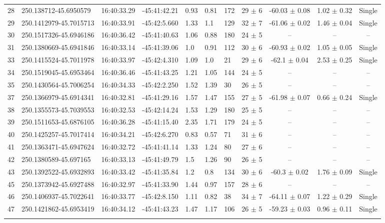 \begin{table}[htbp!]
\begin{tabular}{llllllllccc}
28  &  250.138712-45.6950579  &  16:40:33.29  &  -45:41:42.21  &  0.93  &  0.81  &  172  &  29 $\pm$ 6  &  -60.03 $\pm$ 0.08  &  1.02 $\pm$ 0.32  &  Single \\
29  &  250.1412979-45.7015713  &  16:40:33.91  &  -45:42:5.660  &  1.33  &  1.1  &  129  &  32 $\pm$ 7  &  -61.06 $\pm$ 0.02  &  1.46 $\pm$ 0.04  &  Single \\
30  &  250.1517326-45.6946186  &  16:40:36.42  &  -45:41:40.63  &  1.06  &  0.88  &  180  &  24 $\pm$ 5  &  --  &  --  &  -- \\
31  &  250.1380669-45.6941846  &  16:40:33.14  &  -45:41:39.06  &  1.0  &  0.91  &  112  &  30 $\pm$ 6  &  -60.93 $\pm$ 0.02  &  1.05 $\pm$ 0.05  &  Single \\
33  &  250.1415524-45.7011978  &  16:40:33.97  &  -45:42:4.310  &  1.09  &  1.0  &  21  &  29 $\pm$ 6  &  -62.1 $\pm$ 0.04  &  2.53 $\pm$ 0.25  &  Single \\
34  &  250.1519045-45.6953464  &  16:40:36.46  &  -45:41:43.25  &  1.21  &  1.05  &  144  &  24 $\pm$ 5  &  --  &  --  &  -- \\
35  &  250.1430564-45.7006254  &  16:40:34.33  &  -45:42:2.250  &  1.52  &  1.39  &  30  &  26 $\pm$ 5  &  --  &  --  &  -- \\
37  &  250.1366979-45.6914341  &  16:40:32.81  &  -45:41:29.16  &  1.57  &  1.47  &  155  &  27 $\pm$ 5  &  -61.98 $\pm$ 0.07  &  0.66 $\pm$ 0.24  &  Single \\
38  &  250.1355573-45.7039553  &  16:40:32.53  &  -45:42:14.24  &  1.53  &  1.29  &  180  &  25 $\pm$ 5  &  --  &  --  &  -- \\
39  &  250.1511653-45.6876105  &  16:40:36.28  &  -45:41:15.40  &  2.35  &  1.71  &  179  &  24 $\pm$ 5  &  --  &  --  &  -- \\
40  &  250.1425257-45.7017414  &  16:40:34.21  &  -45:42:6.270  &  0.83  &  0.57  &  71  &  31 $\pm$ 6  &  --  &  --  &  -- \\
41  &  250.1363471-45.6947624  &  16:40:32.72  &  -45:41:41.14  &  1.33  &  1.24  &  80  &  27 $\pm$ 6  &  --  &  --  &  -- \\
42  &  250.1380589-45.697165  &  16:40:33.13  &  -45:41:49.79  &  1.5  &  1.26  &  90  &  26 $\pm$ 5  &  --  &  --  &  -- \\
43  &  250.1392522-45.6932893  &  16:40:33.42  &  -45:41:35.84  &  1.2  &  0.8  &  134  &  30 $\pm$ 6  &  -60.3 $\pm$ 0.02  &  1.76 $\pm$ 0.09  &  Single \\
45  &  250.1373942-45.6927488  &  16:40:32.97  &  -45:41:33.90  &  1.44  &  0.97  &  157  &  28 $\pm$ 6  &  --  &  --  &  -- \\
46  &  250.1406937-45.7022641  &  16:40:33.77  &  -45:42:8.150  &  1.11  &  0.82  &  38  &  34 $\pm$ 7  &  -64.11 $\pm$ 0.07  &  1.22 $\pm$ 0.29  &  Single \\
47  &  250.1421862-45.6953419  &  16:40:34.12  &  -45:41:43.23  &  1.47  &  1.17  &  106  &  26 $\pm$ 5  &  -59.23 $\pm$ 0.03  &  0.96 $\pm$ 0.11  &  Single \\
\hline \noalign {\smallskip}


\end{tabular}
\end{table}
